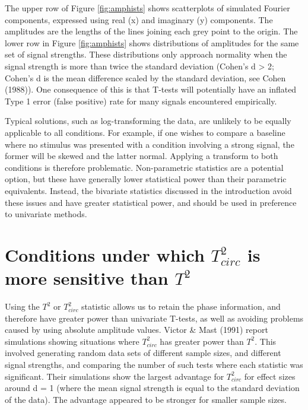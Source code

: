 \documentclass[]{article}
\begin{document}
The upper row of Figure \ref{fig:amphists} shows scatterplots of simulated Fourier components, expressed using real (x) and imaginary (y) components. The amplitudes are the lengths of the lines joining each grey point to the origin. The lower row in Figure \ref{fig:amphists} shows distributions of amplitudes for the same set of signal strengths. These distributions only approach normality when the signal strength is more than twice the standard deviation (Cohen's d \textgreater{} 2; Cohen's d is the mean difference scaled by the standard deviation, see Cohen (1988)). One consequence of this is that T-tests will potentially have an inflated Type 1 error (false positive) rate for many signals encountered empirically.

Typical solutions, such as log-transforming the data, are unlikely to be equally applicable to all conditions. For example, if one wishes to compare a baseline where no stimulus was presented with a condition involving a strong signal, the former will be skewed and the latter normal. Applying a transform to both conditions is therefore problematic. Non-parametric statistics are a potential option, but these have generally lower statistical power than their parametric equivalents. Instead, the bivariate statistics discussed in the introduction avoid these issues and have greater statistical power, and should be used in preference to univariate methods.

\hypertarget{conditions-under-which-t2_circ-is-more-sensitive-than-t2}{%
\section{\texorpdfstring{Conditions under which \(T^2_{circ}\) is more sensitive than \(T^2\)}{Conditions under which T\^{}2\_\{circ\} is more sensitive than T\^{}2}}\label{conditions-under-which-t2_circ-is-more-sensitive-than-t2}}

Using the \(T^2\) or \(T^2_{circ}\) statistic allows us to retain the phase information, and therefore have greater power than univariate T-tests, as well as avoiding problems caused by using absolute amplitude values. Victor \& Mast (1991) report simulations showing situations where \(T^2_{circ}\) has greater power than \(T^2\). This involved generating random data sets of different sample sizes, and different signal strengths, and comparing the number of such tests where each statistic was significant. Their simulations show the largest advantage for \(T^2_{circ}\) for effect sizes around d = 1 (where the mean signal strength is equal to the standard deviation of the data). The advantage appeared to be stronger for smaller sample sizes.
\end{document}
